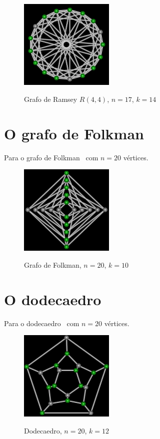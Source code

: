 \begin{figure}[htb]
\centering
\includegraphics[width=0.4\textwidth]{img/ramsey.png}
\label{fig:example-ramsey}
\caption{Grafo de Ramsey $R(4,4)$, $n=17$, $k=14$}
\end{figure}


\section{O grafo de Folkman}
Para o grafo de Folkman~\cite{cite:example-folkman} com $n=20$
vértices.

\begin{figure}[htb]
\centering
\includegraphics[width=0.4\textwidth]{img/folkman.png}
\label{fig:example-folkman}
\caption{Grafo de Folkman, $n=20$, $k=10$}
\end{figure}


\section{O dodecaedro}
Para o dodecaedro~\cite{cite:example-plato} com $n=20$ vértices.

\begin{figure}[htb]
\centering
\includegraphics[width=0.4\textwidth]{img/dodecaedro.png}
\label{fig:example-dodecaedro}
\caption{Dodecaedro, $n=20$, $k=12$}
\end{figure}

